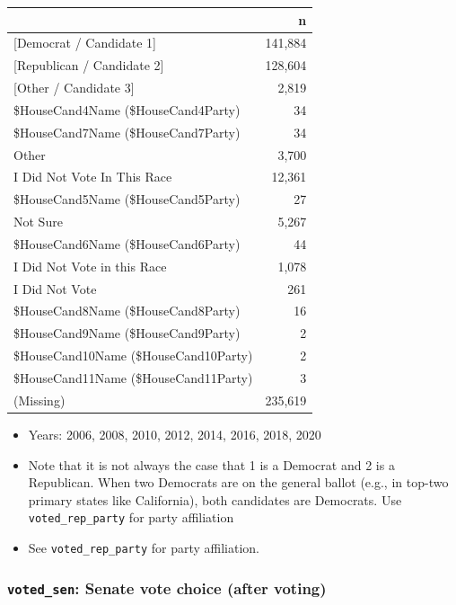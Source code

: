 \documentclass[10pt,article,oneside]{memoir}
\theoremstyle{definition}
\begin{document}
\begin{table}[H]
\centering
\begin{tabular}{lr}
\toprule
 & n\\
\midrule
{[Democrat / Candidate 1]} & 141,884\\
{[Republican / Candidate 2]} & 128,604\\
{[Other / Candidate 3]} & 2,819\\
\$HouseCand4Name (\$HouseCand4Party) & 34\\
\$HouseCand7Name (\$HouseCand7Party) & 34\\
Other & 3,700\\
I Did Not Vote In This Race & 12,361\\
\$HouseCand5Name (\$HouseCand5Party) & 27\\
Not Sure & 5,267\\
\$HouseCand6Name (\$HouseCand6Party) & 44\\
I Did Not Vote in this Race & 1,078\\
I Did Not Vote & 261\\
\$HouseCand8Name (\$HouseCand8Party) & 16\\
\$HouseCand9Name (\$HouseCand9Party) & 2\\
\$HouseCand10Name (\$HouseCand10Party) & 2\\
\$HouseCand11Name (\$HouseCand11Party) & 3\\
(Missing) & 235,619\\
\bottomrule
\end{tabular}
\end{table}

\begin{itemize}
\tightlist
\item
  Years: 2006, 2008, 2010, 2012, 2014, 2016, 2018, 2020
\item
  Note that it is not always the case that 1 is a Democrat and 2 is a
  Republican. When two Democrats are on the general ballot (e.g., in
  top-two primary states like California), both candidates are
  Democrats. Use \texttt{voted\_rep\_party} for party affiliation
\item
  See \texttt{voted\_rep\_party} for party affiliation.
\end{itemize}

\hypertarget{voted_sen-senate-vote-choice-after-voting}{%
\subsubsection{\texorpdfstring{\texttt{voted\_sen}: Senate vote choice
(after
voting)}{voted\_sen: Senate vote choice (after voting)}}\label{voted_sen-senate-vote-choice-after-voting}}
\end{document}
